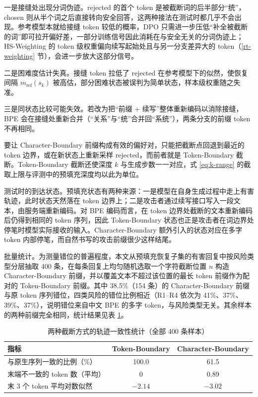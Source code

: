 \documentclass[fontset=fandol,type=master,campus=shenzhen,etitleauto=true]{hithesisbook}
\begin{document}
一是接缝处出现分词伪迹。rejected 的首个 token 是被截断词的后半部分“统”，chosen 则从半个词之后直接转向安全回答，这两种接法在测试时都几乎不会出现。参考模型本就给接缝 token 较低的概率，DPO 只需进一步压低“补全被截断的词”即可拉开偏好差，一部分训练信号因此消耗在与安全无关的分词伪迹上；HS-Weighting 的 token 级权重偏向续写起始处且与另一分支差异大的 token（\ref{rt-weighting} 节），会进一步放大这部分信号。

二是困难度估计失真。接缝 token 拉低了 rejected 在参考模型下的似然，使恢复间隔 $m_{\text{ref}}(s_k)$ 被高估，部分困难状态被误判为简单状态，样本级权重随之失准。

三是同状态比较可能失效。若改为把“前缀 + 续写”整体重新编码以消除接缝，BPE 会在接缝处重新合并（“关系”与“统”合并回“系统”），两条分支的前缀 token 不再相同。

要让 Character-Boundary 前缀构成有效的偏好对，只能把截断点回退到最近的 token 边界，或在新状态上重新采样 rejected，而前者就是 Token-Boundary 截断。Token-Boundary 截断还使深度 $k$ 与生成步数一一对应，式 \eqref{eq:k-range} 的截取上限与评测中的预填充深度均以此为单位。

测试时的到达状态。预填充状态有两种来源：一是模型在自身生成过程中走上有害轨迹，此时状态天然落在 token 边界上；二是攻击者通过续写接口写入一段文本，由服务端重新编码。对 BPE 编码而言，在 token 边界处截断的文本重新编码后仍得到相同的 token 序列，因此 Token-Boundary 状态也正是攻击者在词边界处停笔时模型实际接收的输入。Character-Boundary 额外引入的状态对应在多字 token 内部停笔，而自然书写的攻击前缀很少这样结尾。

批量统计。为测量错位的普遍程度，本文从预填充恢复子集的有害回复中按风险类型分层抽取 400 条，在每条回复上均匀随机选取一个字符截断位置 $n$ 构造 Character-Boundary 前缀，并以覆盖文本不超过该位置的最长 token 前缀作为配对的 Token-Boundary 前缀。其中 38.5\%（154 条）的 Character-Boundary 前缀与原 token 序列错位，四类风险的错位比例相近（R1--R4 依次为 41\%、37\%、39\%、37\%），说明错位来自中文 BPE 的多字 token，与风险类型无关。其余样本的两种前缀完全相同，统计结果见表 \ref{tab:trunc-batch}。

\begin{table}[htbp]
\centering
\caption{两种截断方式的轨迹一致性统计（全部 400 条样本）}
\label{tab:trunc-batch}
\small
\renewcommand{\arraystretch}{1.15}
\begin{tabular}{l c c}
\toprule
\textbf{指标} & \textbf{Token-Boundary} & \textbf{Character-Boundary} \\
\midrule
与原生序列一致的比例（\%） & 100.0 & 61.5 \\
末端不一致的 token 数（平均） & 0 & 0.89 \\
末 3 个 token 平均对数似然 & $-2.14$ & $-3.02$ \\
\bottomrule
\end{tabular}
\end{table}
\end{document}

